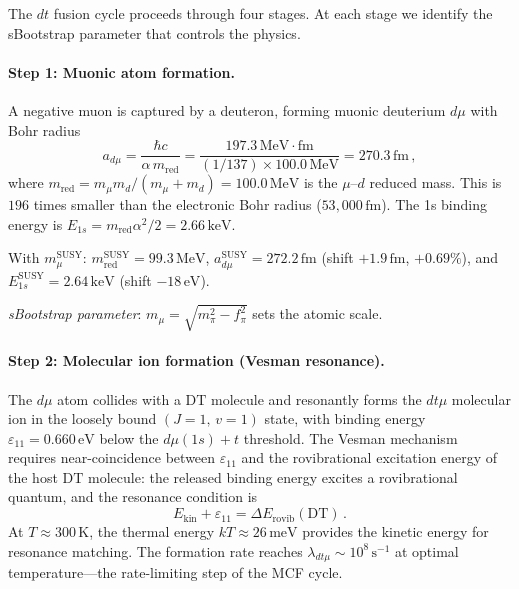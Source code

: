 \documentclass[12pt,a4paper]{article}
\newcommand{\MeV}{\,\text{MeV}}
\newcommand{\eV}{\,\text{eV}}
\newcommand{\keV}{\,\text{keV}}
\newcommand{\fpi}{f_\pi}
\begin{document}
The $dt$ fusion cycle proceeds through four stages.  At each stage
we identify the sBootstrap parameter that controls the physics.

\paragraph{Step 1: Muonic atom formation.}
A negative muon is captured by a deuteron, forming muonic deuterium
$d\mu$ with Bohr radius
\begin{equation}
  a_{d\mu} = \frac{\hbar c}{\alpha\,m_{\text{red}}}
  = \frac{197.3\MeV\cdot\text{fm}}{(1/137)\times 100.0\MeV}
  = 270.3\,\text{fm}\,,
\end{equation}
where $m_{\text{red}} = m_\mu m_d/(m_\mu + m_d) = 100.0\MeV$ is the
$\mu$--$d$ reduced mass.  This is $196$ times smaller than the
electronic Bohr radius ($53{,}000\,\text{fm}$).  The 1s binding energy
is $E_{1s} = m_{\text{red}}\alpha^2/2 = 2.66\keV$.

With $m_\mu^{\text{SUSY}}$: $m_{\text{red}}^{\text{SUSY}} = 99.3\MeV$,
$a_{d\mu}^{\text{SUSY}} = 272.2\,\text{fm}$ (shift $+1.9\,\text{fm}$,
$+0.69\%$), and $E_{1s}^{\text{SUSY}} = 2.64\keV$ (shift $-18\eV$).

\emph{sBootstrap parameter}: $m_\mu = \sqrt{m_\pi^2 - \fpi^2}$ sets
the atomic scale.

\paragraph{Step 2: Molecular ion formation (Vesman resonance).}
The $d\mu$ atom collides with a $\text{DT}$ molecule and resonantly
forms the $dt\mu$ molecular ion in the loosely bound
$(J=1,\,v=1)$ state, with binding energy
$\varepsilon_{11} = 0.660\eV$ below the $d\mu(1s) + t$ threshold.
The Vesman mechanism~\cite{Vesman1967} requires near-coincidence
between $\varepsilon_{11}$ and the rovibrational excitation energy of
the host $\text{DT}$ molecule: the released binding energy excites
a rovibrational quantum, and the resonance condition is
\begin{equation}
  E_{\text{kin}} + \varepsilon_{11}
  = \Delta E_{\text{rovib}}(\text{DT})\,.
\end{equation}
At $T \approx 300\,\text{K}$, the thermal energy $kT \approx 26\,\text{meV}$
provides the kinetic energy for resonance matching.  The formation
rate reaches $\lambda_{dt\mu} \sim 10^{8}\,\text{s}^{-1}$ at
optimal temperature---the rate-limiting step of the MCF cycle.
\end{document}
